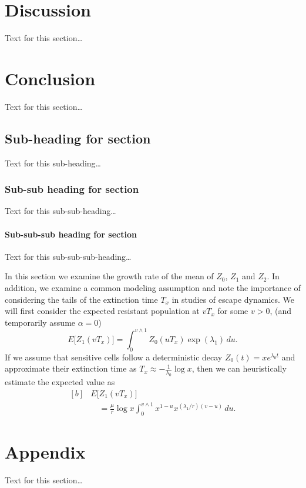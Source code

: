 \documentclass{bmcart}
\begin{document}
\newpage

	\section*{Discussion}
	Text for this section\ldots
	\section*{Conclusion}
	Text for this section\ldots
	\subsection*{Sub-heading for section}
	Text for this sub-heading\ldots
	\subsubsection*{Sub-sub heading for section}
	Text for this sub-sub-heading\ldots
	\paragraph*{Sub-sub-sub heading for section}
	Text for this sub-sub-sub-heading\ldots
	
	In this section we examine the growth rate of the mean of $Z_0$, $Z_1$ and $Z_2$. In
	addition, we examine a common modeling assumption and note the
	importance of considering the tails of the extinction time $T_x$ in
	studies of escape dynamics.
	We will first consider the expected resistant population at $vT_x$ for
	some $v>0$, (and temporarily assume $\alpha=0$)
	\[
	E \bigl[Z_1(vT_x) \bigr]=
	\int_0^{v\wedge
		1}Z_0(uT_x)
	\exp (\lambda_1)\,du .
	\]
	If we assume that sensitive cells follow a deterministic decay
	$Z_0(t)=xe^{\lambda_0 t}$ and approximate their extinction time as
	$T_x\approx-\frac{1}{\lambda_0}\log x$, then we can heuristically
	estimate the expected value as
	\begin{equation}\label{eqexpmuts}
		\begin{aligned}[b]
			&      E\bigl[Z_1(vT_x)\bigr]\\
			&\quad      = \frac{\mu}{r}\log x
			\int_0^{v\wedge1}x^{1-u}x^{({\lambda_1}/{r})(v-u)}\,du .
		\end{aligned}
	\end{equation}
	
	
	\section*{Appendix}
	Text for this section\ldots
	
\end{document}
